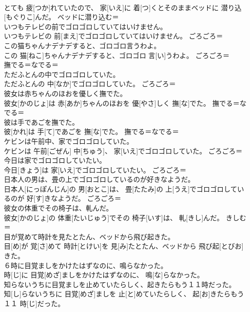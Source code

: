 \documentclass[8pt]{extreport}
\begin{document}
\begin{CJK}{UTF8}{min}
\\	とても 疲[つか]れていたので、 家[いえ]に 着[つ]くとそのままベッドに 潜り込[もぐりこ]んだ。	ベッドに潜り込む＝ 
\\	いつもテレビの前でゴロゴロしていてはいけません。	
\\	いつもテレビの 前[まえ]でゴロゴロしていてはいけません。	ごろごろ＝ 
\\	この猫ちゃんナデナデすると、ゴロゴロ言うわよ。	
\\	この 猫[ねこ]ちゃんナデナデすると、ゴロゴロ 言[い]うわよ。	ごろごろ＝ 
\\	撫でる＝なでる＝ 
\\	ただふとんの中でゴロゴロしていた。	
\\	ただふとんの 中[なか]でゴロゴロしていた。	ごろごろ＝ 
\\	彼女は赤ちゃんのほおを優しく撫でた。	
\\	彼女[かのじょ]は 赤[あか]ちゃんのほおを 優[やさ]しく 撫[な]でた。	撫でる＝なでる＝ 
\\	彼は手であごを撫でた。	
\\	彼[かれ]は 手[て]であごを 撫[な]でた。	撫でる＝なでる＝ 
\\	ケビンは午前中、家でゴロゴロしていた。	
\\	ケビンは 午前[ごぜん] 中[ちゅう]、 家[いえ]でゴロゴロしていた。	ごろごろ＝ 
\\	今日は家でゴロゴロしていたい。	
\\	今日[きょう]は 家[いえ]でゴロゴロしていたい。	ごろごろ＝ 
\\	日本人の男は、畳の上でゴロゴロしているのが好きなようだ。	
\\	日本人[にっぽんじん]の 男[おとこ]は、 畳[たたみ]の 上[うえ]でゴロゴロしているのが 好[す]きなようだ。	ごろごろ＝ 
\\	彼女の体重でその椅子は、軋んだ。	
\\	彼女[かのじょ]の 体重[たいじゅう]でその 椅子[いす]は、 軋[きし]んだ。	きしむ＝ 
\\	目が覚めて時計を見たとたん、ベッドから飛び起きた。	
\\	目[め]が 覚[さ]めて 時計[とけい]を 見[み]たとたん、ベッドから 飛び起[とびお]きた。	
\\	６時に目覚ましをかけたはずなのに、鳴らなかった。	
\\	時[じ]に 目覚[めざ]ましをかけたはずなのに、 鳴[な]らなかった。	
\\	知らないうちに目覚ましを止めていたらしく、起きたらもう１１時だった。	
\\	知[し]らないうちに 目覚[めざ]ましを 止[と]めていたらしく、 起[お]きたらもう１１ 時[じ]だった。	

\end{CJK}
\end{document}
